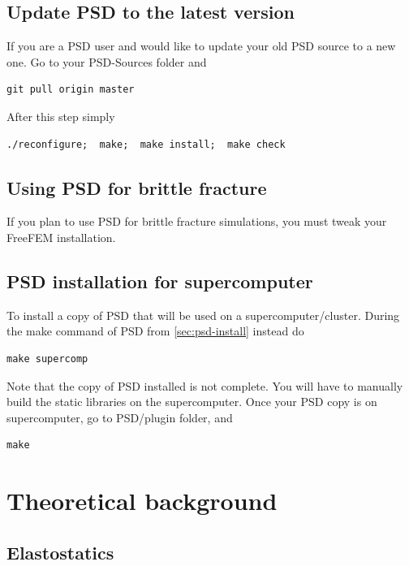 \documentclass{report}
\begin{document}
\section{Update PSD to the latest version}

If you are a PSD user and would like to update your old PSD source to a new one. Go to your {\ttfamily PSD-Sources} folder and

\begin{lstlisting}[style=Linux]
git pull origin master
\end{lstlisting}

After this step simply

\begin{lstlisting}[style=Linux]
./reconfigure;  make;  make install;  make check
\end{lstlisting}

\section{Using PSD for brittle fracture}

If you plan to use PSD for brittle fracture simulations, you must tweak your FreeFEM installation.

\section{PSD installation for supercomputer}

To install a copy of PSD that will be used on a supercomputer/cluster. During the  {\ttfamily make} command of PSD from \cref{sec:psd-install} instead do 

\begin{lstlisting}[style=Linux]
make supercomp
\end{lstlisting}

Note that the copy of PSD installed is not complete. You will have to manually build the static libraries on the supercomputer. Once your PSD copy is on supercomputer, go to  {\ttfamily PSD/plugin} folder, and 
\begin{lstlisting}[style=Linux]
make
\end{lstlisting}


\chapter{Theoretical background}

\section{Elastostatics}
\end{document}
